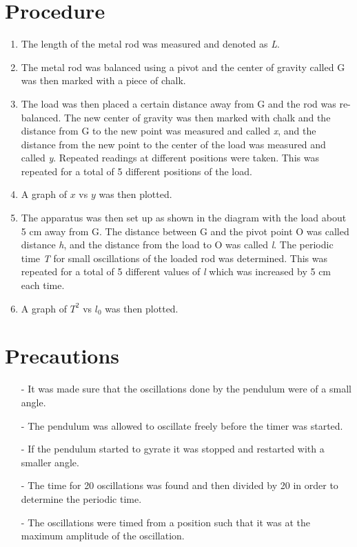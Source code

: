 \documentclass[12pt, a4paper]{article}
\begin{document}
\section*{Procedure}
\begin{enumerate}
    \item The length of the metal rod was measured and denoted as \textit{L}.
    \item The metal rod was balanced using a pivot and the center of gravity called G was then marked with a piece of chalk.
    \item The load was then placed a certain distance away from G and the rod was re-balanced. The new center of gravity was then marked with chalk and the distance from G to the new point was measured and called \textit{x}, and the distance from the new point to the center of the load was measured and called \textit{y}. Repeated readings at different positions were taken. This was repeated for a total of 5 different positions of the load.
    \item A graph of $x$ vs $y$ was then plotted.
    \item The apparatus was then set up as shown in the diagram with the load about 5 cm away from G. The distance between G and the pivot point O was called distance \textit{h}, and the distance from the load to O was called \textit{l}. The periodic time \textit{T} for small oscillations of the loaded rod was determined. This was repeated for a total of 5 different values of \textit{l} which was increased by 5 cm each time.
    \item A graph of $T^2$ vs $l_0$ was then plotted. 
\end{enumerate}

\section*{Precautions}
\begin{itemize}
    \item[-] It was made sure that the oscillations done by the pendulum were of a small angle.
    \item[-] The pendulum was allowed to oscillate freely before the timer was started.
    \item[-] If the pendulum started to gyrate it was stopped and restarted with a smaller angle.
    \item[-] The time for 20 oscillations was found and then divided by 20 in order to determine the periodic time.
    \item[-] The oscillations were timed from a position such that it was at the maximum amplitude of the oscillation.
\end{itemize}
\end{document}
